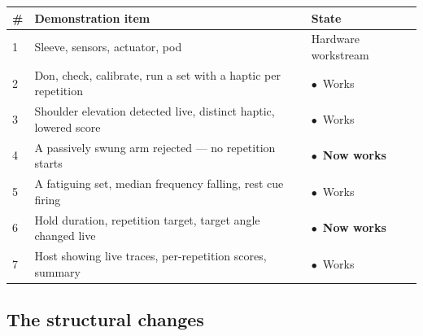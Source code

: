 \documentclass[11pt]{article}
\newcommand{\mY}{{\color{good}$\bullet$}}
\begin{document}
\begin{table}[H]
\centering\small
\begin{tabularx}{\linewidth}{@{}p{6mm} X p{26mm}@{}}
\toprule
\textbf{\#} & \textbf{Demonstration item} & \textbf{State} \\
\midrule
1 & Sleeve, sensors, actuator, pod & Hardware workstream \\
2 & Don, check, calibrate, run a set with a haptic per repetition & \mY\ Works \\
3 & Shoulder elevation detected live, distinct haptic, lowered score & \mY\ Works \\
4 & A passively swung arm rejected --- no repetition starts & \mY\ \textbf{Now works} \\
5 & A fatiguing set, median frequency falling, rest cue firing & \mY\ Works \\
6 & Hold duration, repetition target, target angle changed live & \mY\ \textbf{Now works} \\
7 & Host showing live traces, per-repetition scores, summary & \mY\ Works \\
\bottomrule
\end{tabularx}
\end{table}

\subsection{The structural changes}
\end{document}
